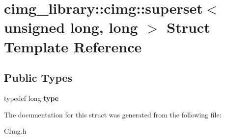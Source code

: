 \hypertarget{structcimg__library_1_1cimg_1_1superset_3_01unsigned_01long_00_01long_01_4}{\section{cimg\-\_\-library\-:\-:cimg\-:\-:superset$<$ unsigned long, long $>$ Struct Template Reference}
\label{structcimg__library_1_1cimg_1_1superset_3_01unsigned_01long_00_01long_01_4}
}
\subsection*{Public Types}
\begin{DoxyCompactItemize}
\item 
\hypertarget{structcimg__library_1_1cimg_1_1superset_3_01unsigned_01long_00_01long_01_4_a900b84db86a51e545f428549550bf855}{typedef long {\bfseries type}}\label{structcimg__library_1_1cimg_1_1superset_3_01unsigned_01long_00_01long_01_4_a900b84db86a51e545f428549550bf855}

\end{DoxyCompactItemize}


The documentation for this struct was generated from the following file\-:\begin{DoxyCompactItemize}
\item 
C\-Img.\-h\end{DoxyCompactItemize}

